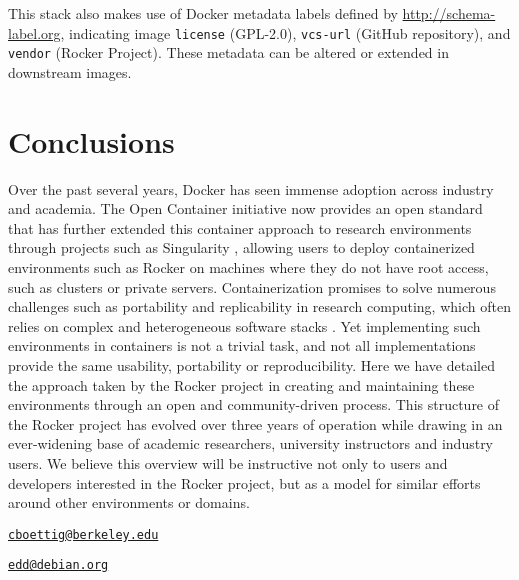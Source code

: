 This stack also makes use of Docker metadata labels defined by
\url{http://schema-label.org}, indicating image \texttt{license}
(GPL-2.0), \texttt{vcs-url} (GitHub repository), and \texttt{vendor}
(Rocker Project). These metadata can be altered or extended in
downstream images.

\section{Conclusions}\label{conclusions}

Over the past several years, Docker has seen immense adoption across
industry and academia. The Open Container initiative \citep{oci} now
provides an open standard that has further extended this container
approach to research environments through projects such as Singularity
\citep{singularity}, allowing users to deploy containerized environments
such as Rocker on machines where they do not have root access, such as
clusters or private servers. Containerization promises to solve numerous
challenges such as portability and replicability in research computing,
which often relies on complex and heterogeneous software stacks
\citep{Boettiger2015}. Yet implementing such environments in containers
is not a trivial task, and not all implementations provide the same
usability, portability or reproducibility. Here we have detailed the
approach taken by the Rocker project in creating and maintaining these
environments through an open and community-driven process. This
structure of the Rocker project has evolved over three years of
operation while drawing in an ever-widening base of academic
researchers, university instructors and industry users. We believe this
overview will be instructive not only to users and developers interested
in the Rocker project, but as a model for similar efforts around other
environments or domains.



\address{%
Carl Boettiger\\
UC Berkeley\\
ESPM Department, University of California,\\ 130 Mulford Hall Berkeley, CA 94720-3114, USA\\ ORCiD \href{https://orcid.org/0000-0002-1642-628X}{0000-0002-1642-628X}\\
}
\href{mailto:cboettig@berkeley.edu}{\nolinkurl{cboettig@berkeley.edu}}

\address{%
Dirk Eddelbuettel\\
Debian and R Projects; Ketchum Trading\\
Chicago, IL, USA\\ ORCiD \href{https://orcid.org/0000-0001-6419-907X}{0000-0001-6419-907X}\\
}
\href{mailto:edd@debian.org}{\nolinkurl{edd@debian.org}}

